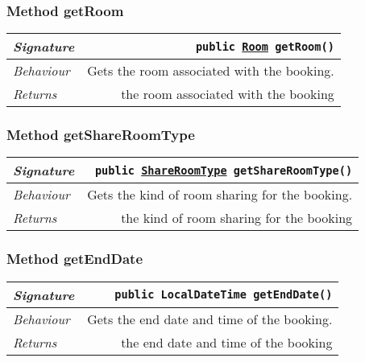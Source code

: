 \begin{adjustwidth}{1.5em}{0pt}
\begin{adjustwidth}{1.5em}{0pt}
\begin{adjustwidth}{1.5em}{0pt}
{\begin{tabularx}{1.0\linewidth}{@{}l R@{}}
      \end{tabularx}}
    \end{adjustwidth}\subsubsection{Method getRoom\label{edu.kit.hci.soli.domain.Booking@getRoom()}}
    \begin{adjustwidth}{1.5em}{0pt}
      {\begin{tabularx}{1.0\linewidth}{@{}l R@{}}
        \emph{Signature} & \texttt{public \texttt{\hyperref[edu.kit.hci.soli.domain.Room]{\texttt{Room}}} getRoom()} \\
        \hline
        \emph{Behaviour} & Gets the room associated with the booking.    \\
        \hline
        \emph{Returns} & the room associated with the booking  \\
        \hline
  
      \end{tabularx}}
    \end{adjustwidth}\subsubsection{Method getShareRoomType\label{edu.kit.hci.soli.domain.Booking@getShareRoomType()}}
    \begin{adjustwidth}{1.5em}{0pt}
      {\begin{tabularx}{1.0\linewidth}{@{}l R@{}}
        \emph{Signature} & \texttt{public \texttt{\hyperref[edu.kit.hci.soli.domain.ShareRoomType]{\texttt{ShareRoomType}}} getShareRoomType()} \\
        \hline
        \emph{Behaviour} & Gets the kind of room sharing for the booking.    \\
        \hline
        \emph{Returns} & the kind of room sharing for the booking  \\
        \hline
  
      \end{tabularx}}
    \end{adjustwidth}\subsubsection{Method getEndDate\label{edu.kit.hci.soli.domain.Booking@getEndDate()}}
    \begin{adjustwidth}{1.5em}{0pt}
      {\begin{tabularx}{1.0\linewidth}{@{}l R@{}}
        \emph{Signature} & \texttt{public \texttt{LocalDateTime} getEndDate()} \\
        \hline
        \emph{Behaviour} & Gets the end date and time of the booking.    \\
        \hline
        \emph{Returns} & the end date and time of the booking  \\
        \hline
  

\end{tabularx}}
\end{adjustwidth}
\end{adjustwidth}
\end{adjustwidth}
